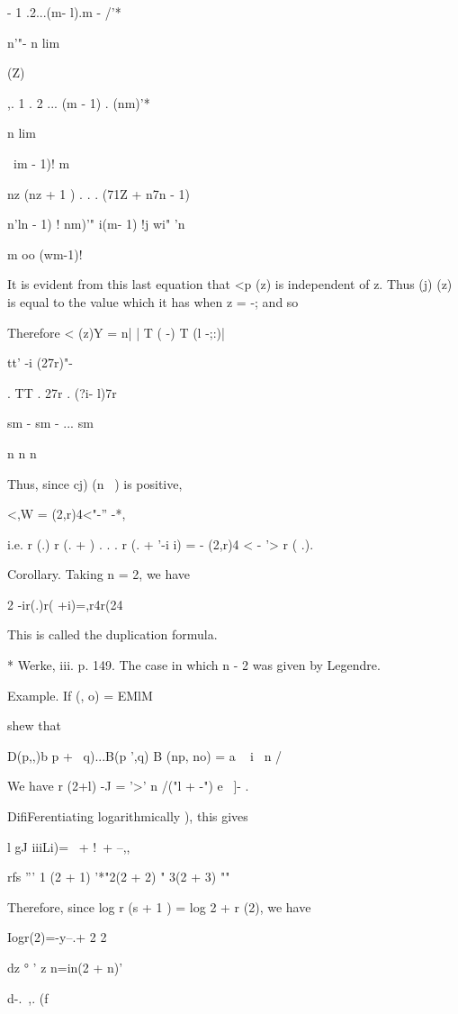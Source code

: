  - 1 .2...(m- l).m - /'*

n'"- n lim

 (Z)

,. 1 . 2 ... (m - 1) . (nm)'*

n lim

\ im - 1)! m

nz (nz + 1 ) . . . (71Z + n7n - 1)

 n'ln - 1) ! nm)'" i(m- 1) !j wi" 'n

m oo (wm-1)!

It is evident from this last equation that <p (z) is independent of z.
Thus (j) (z) is equal to the value which it has when z = -; and so

Therefore < (z)Y = n| | T ( -) T (l -;:)|

tt' -i (27r)"-

. TT . 27r . (?i- l)7r

sm - sm - ... sm

n n n

Thus, since cj) (n~ ) is positive,

<,W = (2,r)4<"-'' -*,

i.e. r (.) r (. + ) . . . r (. + '-i i) = - (2,r)4 < - '> r ( .).

Corollary. Taking n = 2, we have

2 -ir(.)r( +i)=,r4r(24

This is called the duplication formula.

* Werke, iii. p. 149. The case in which n - 2 was given by Legendre.

%
%

Example. If (, o) = EMlM

shew that

D(p,,)b p + \ q)...B(p ',q) B (np, no) = a ~ i \ n /


We have r (2+l) -J = '>' n /("l + -") e~ ]- .

DifiFerentiating logarithmically ), this gives

l gJ iiiLi)= \ + !\ + --,,

rfs ''' 1 (2 + 1) '*"2(2 + 2) " 3(2 + 3) ""

Therefore, since log r (s + 1 ) = log 2 + r (2), we have

Iogr(2)=-y--.+ 2 2

dz ° ' z n=in(2 + n)'

d-. \,,. (f

